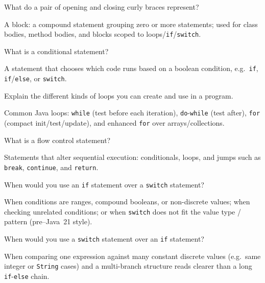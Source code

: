
\question[4]
What do a pair of opening and closing curly braces represent?
\begin{solutionorbox}[1in]
  A block: a compound statement grouping zero or more statements; used for class bodies, method bodies, and blocks scoped to loops/\texttt{if}/\texttt{switch}.
\end{solutionorbox}

\question[4]
What is a conditional statement?
\begin{solutionorbox}[1.05in]
  A statement that chooses which code runs based on a boolean condition, e.g.\ \texttt{if}, \texttt{if}/\texttt{else}, or \texttt{switch}.
\end{solutionorbox}

\question[4]
Explain the different kinds of loops you can create and use in a program.
\begin{solutionorbox}[1.5in]
  Common Java loops: \texttt{while} (test before each iteration), \texttt{do}-\texttt{while} (test after), \texttt{for} (compact init/test/update), and enhanced \texttt{for} over arrays/collections.
\end{solutionorbox}

\newpage

\question[4]
What is a flow control statement?
\begin{solutionorbox}[1.1in]
  Statements that alter sequential execution: conditionals, loops, and jumps such as \texttt{break}, \texttt{continue}, and \texttt{return}.
\end{solutionorbox}

\question[4]
When would you use an \texttt{if} statement over a \texttt{switch} statement?
\begin{solutionorbox}[1.2in]
  When conditions are ranges, compound booleans, or non-discrete values; when checking unrelated conditions; or when \texttt{switch} does not fit the value type / pattern (pre--Java~21 style).
\end{solutionorbox}

\question[4]
When would you use a \texttt{switch} statement over an \texttt{if} statement?
\begin{solutionorbox}[1.2in]
  When comparing one expression against many constant discrete values (e.g.\ same integer or \texttt{String} cases) and a multi-branch structure reads clearer than a long \texttt{if}-\texttt{else} chain.
\end{solutionorbox}

